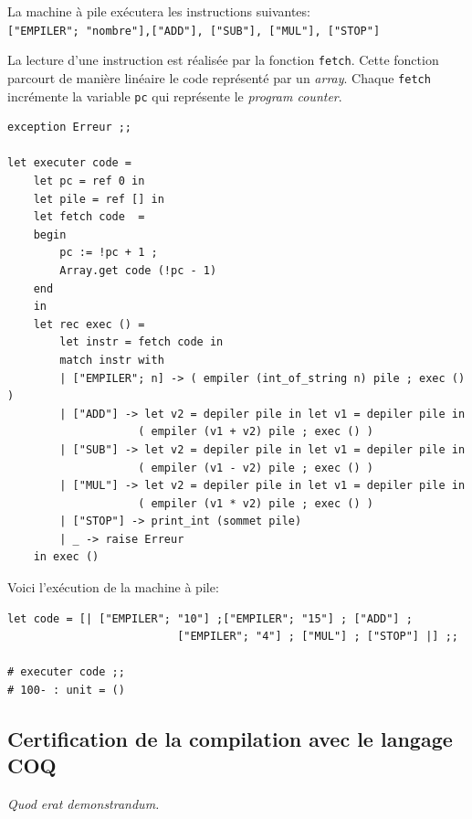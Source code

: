 \documentclass[11pt]{book}
\begin{document}
La machine à pile exécutera les instructions suivantes:\\
\verb+["EMPILER"; "nombre"],["ADD"], ["SUB"], ["MUL"], ["STOP"]+

La lecture d'une instruction est réalisée par la fonction \texttt{fetch}. Cette
fonction parcourt de manière linéaire le code représenté par un \textit{array}.
Chaque \texttt{fetch} incrémente la variable \verb+pc+ qui représente le
\textit{program counter}.

\begin{Verbatim}
exception Erreur ;;
	
let executer code =
	let pc = ref 0 in
	let pile = ref [] in
	let fetch code  =
	begin
		pc := !pc + 1 ; 
		Array.get code (!pc - 1) 
	end 
	in
	let rec exec () =
		let instr = fetch code in
		match instr with
		| ["EMPILER"; n] -> ( empiler (int_of_string n) pile ; exec () )
		| ["ADD"] -> let v2 = depiler pile in let v1 = depiler pile in 
		            ( empiler (v1 + v2) pile ; exec () )
		| ["SUB"] -> let v2 = depiler pile in let v1 = depiler pile in
		            ( empiler (v1 - v2) pile ; exec () )
		| ["MUL"] -> let v2 = depiler pile in let v1 = depiler pile in
		            ( empiler (v1 * v2) pile ; exec () )
		| ["STOP"] -> print_int (sommet pile)
		| _ -> raise Erreur
	in exec ()
\end{Verbatim}

Voici l'exécution de la machine à pile:
\begin{Verbatim}
let code = [| ["EMPILER"; "10"] ;["EMPILER"; "15"] ; ["ADD"] ;
						  ["EMPILER"; "4"] ; ["MUL"] ; ["STOP"] |] ;;
						  
# executer code ;;
# 100- : unit = ()
\end{Verbatim}

\subsection{Certification de la compilation avec le langage COQ}
\textit{Quod erat demonstrandum.}
\begin{center}
\end{center}
\end{document}
